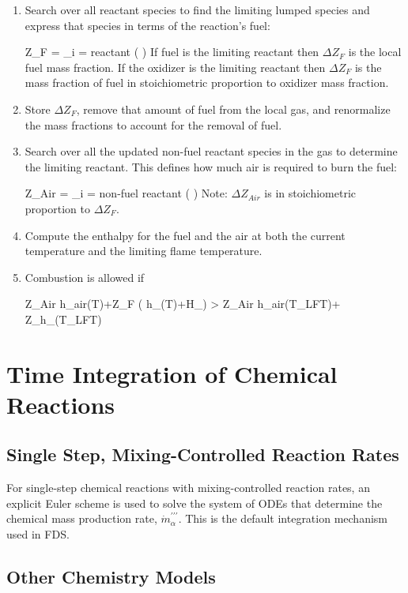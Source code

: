 \begin{enumerate}
\item Search over all reactant species to find the limiting lumped species and express that species in terms of the reaction's fuel:

\be \Delta Z_F = \min_{i \; = \; reactant} \left( \right) \ee
If fuel is the limiting reactant then $\Delta Z_F$ is the local fuel mass fraction. If the oxidizer is the limiting reactant then $\Delta Z_F$ is the mass fraction of fuel in stoichiometric proportion to oxidizer mass fraction.
\item Store $\Delta Z_F$, remove that amount of fuel from the local gas, and renormalize the mass fractions to account for the removal of fuel.
\item Search over all the updated non-fuel reactant species in the gas to determine the limiting reactant.  This defines how much air is required to burn the fuel:

\be \Delta Z_{Air} = \min_{i \; = \; non-fuel \; reactant} \left( \right) \ee
Note: $\Delta Z_{Air}$ is in stoichiometric proportion to $\Delta Z_{F}$.
\item Compute the enthalpy for the fuel and the air at both the current temperature and the limiting flame temperature.
\item Combustion is allowed if 

\be \Delta Z_{Air} h_{air}(T)+\Delta Z_F \left( h_\F(T)+\Delta H_\F \right) > \Delta Z_{Air} h_{air}(T_{LFT})+ \Delta Z_\F h_\F(T_{LFT}) \ee

\end{enumerate}

\section{Time Integration of Chemical Reactions}

\subsection{Single Step, Mixing-Controlled Reaction Rates}
For single-step chemical reactions with mixing-controlled reaction rates, an explicit Euler scheme is used to solve the system of ODEs that determine the chemical mass production rate, $\dot{m}^{\prime\prime\prime}_{\alpha}$. This is the default integration mechanism used in FDS.

\subsection{Other Chemistry Models}

